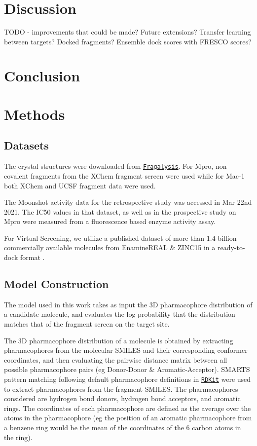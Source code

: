 \documentclass[journal=jacsat,manuscript=article]{achemso}
\begin{document}
\section{Discussion}

TODO - improvements that could be made? Future extensions? Transfer learning between targets? Docked fragments? Ensemble dock scores with FRESCO scores?

\section{Conclusion}

\section{Methods} \label{sec:methods}
\subsection{Datasets}

The crystal structures were downloaded from \href{https://fragalysis.diamond.ac.uk/viewer/react/landing}{\texttt{Fragalysis}}. For Mpro, non-covalent fragments from the XChem fragment screen \cite{Douangamath2020XChem} were used while for Mac-1 both XChem and UCSF fragment data were used.

The Moonshot activity data for the retrospective study was accessed in Mar 22nd 2021. The IC50 values in that dataset, as well as in the prospective study on Mpro were measured from a fluorescence based enzyme activity assay.

For Virtual Screening, we utilize a published dataset of more than 1.4 billion commercially available molecules from EnamineREAL \& ZINC15 in a ready-to-dock format \cite{Gorgulla2020VirtualFlow}.

\subsection{Model Construction}
The model used in this work takes as input the 3D pharmacophore distribution of a candidate molecule, and evaluates the log-probability that the distribution matches that of the fragment screen on the target site.

The 3D pharmacophore distribution of a molecule is obtained by extracting pharmacophores from the molecular SMILES and their corresponding conformer coordinates, and then evaluating the pairwise distance matrix between all possible pharmacophore pairs (eg Donor-Donor \& Aromatic-Acceptor). SMARTS pattern matching following default pharmacophore definitions in \href{https://www.rdkit.org/docs/index.html}{\texttt{RDKit}} were used to extract pharmacophores from the fragment SMILES. The pharmacophores considered are hydrogen bond donors, hydrogen bond acceptors, and aromatic rings. The coordinates of each pharmacophore are defined as the average over the atoms in the pharmacophore (eg the position of an aromatic pharmacophore from a benzene ring would be the mean of the coordinates of the 6 carbon atoms in the ring). 
\end{document}
